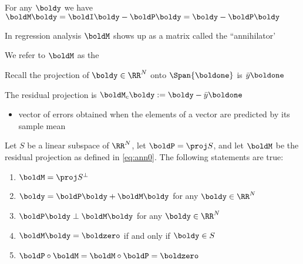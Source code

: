 \begin{frame}

     \vspace{2em}
    For any $\boldy$ we have 
    $\boldM \boldy = \boldI \boldy - \boldP \boldy = \boldy - \boldP \boldy$
    
    \vspace{.7em}
    In regression analysis $\boldM$ shows up as a matrix 
    called the ``annihilator'
    
    \vspace{.7em}
    We  refer to $\boldM$ as the 
    
\end{frame}

\begin{frame}

     \vspace{2em}
    \Eg
    Recall the projection of
    $\boldy \in \RR^N$ onto $\Span\{\boldone\}$ is
    $\bar y \boldone$
    
    The residual projection is $\boldM_c \boldy := \boldy -
    \bar y \boldone$
    \begin{itemize}
        \item  vector of errors obtained when the elements of a vector are
         predicted by its sample mean
    \end{itemize}
    
    
\end{frame}

\begin{frame}

    \vspace{2em}
    \Fact{\eqref{ET-fa:opt3}}
    Let $S$ be a linear subspace of $\RR^N$, let $\boldP = \proj S$, and let
    $\boldM$ be the residual projection as defined in \eqref{eq:ann0}.  The
    following statements are true:
    \begin{enumerate}
        \item $\boldM = \proj S^{\perp}$
        \item $\boldy = \boldP \boldy + \boldM \boldy$ for any $\boldy \in
            \RR^N$
        \item $\boldP \boldy \perp \boldM \boldy$ for any $\boldy \in \RR^N$
        \item $\boldM \boldy = \boldzero$ if and only if $\boldy \in S$
        \item $\boldP \circ \boldM = \boldM \circ \boldP = \boldzero$
    \end{enumerate}
\end{frame}

